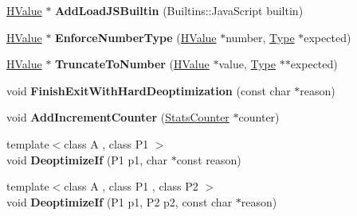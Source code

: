 \begin{DoxyCompactItemize}
\item 
\hypertarget{classv8_1_1internal_1_1_h_graph_builder_a3b52e583c74199a203865d54142ef993}{}\hyperlink{classv8_1_1internal_1_1_h_value}{H\+Value} $\ast$ {\bfseries Add\+Load\+J\+S\+Builtin} (Builtins\+::\+Java\+Script builtin)\label{classv8_1_1internal_1_1_h_graph_builder_a3b52e583c74199a203865d54142ef993}

\item 
\hypertarget{classv8_1_1internal_1_1_h_graph_builder_aa0318ed052ad3dde76828cc864ece24f}{}\hyperlink{classv8_1_1internal_1_1_h_value}{H\+Value} $\ast$ {\bfseries Enforce\+Number\+Type} (\hyperlink{classv8_1_1internal_1_1_h_value}{H\+Value} $\ast$number, \hyperlink{classv8_1_1internal_1_1_type_impl}{Type} $\ast$expected)\label{classv8_1_1internal_1_1_h_graph_builder_aa0318ed052ad3dde76828cc864ece24f}

\item 
\hypertarget{classv8_1_1internal_1_1_h_graph_builder_ad85f954e0270d90f5d078d607b5069ba}{}\hyperlink{classv8_1_1internal_1_1_h_value}{H\+Value} $\ast$ {\bfseries Truncate\+To\+Number} (\hyperlink{classv8_1_1internal_1_1_h_value}{H\+Value} $\ast$value, \hyperlink{classv8_1_1internal_1_1_type_impl}{Type} $\ast$$\ast$expected)\label{classv8_1_1internal_1_1_h_graph_builder_ad85f954e0270d90f5d078d607b5069ba}

\item 
\hypertarget{classv8_1_1internal_1_1_h_graph_builder_a0b1e9d2b9e640ecff306e5ca95e743fa}{}void {\bfseries Finish\+Exit\+With\+Hard\+Deoptimization} (const char $\ast$reason)\label{classv8_1_1internal_1_1_h_graph_builder_a0b1e9d2b9e640ecff306e5ca95e743fa}

\item 
\hypertarget{classv8_1_1internal_1_1_h_graph_builder_acffb06904a8374625c042229fa46d4a4}{}void {\bfseries Add\+Increment\+Counter} (\hyperlink{classv8_1_1internal_1_1_stats_counter}{Stats\+Counter} $\ast$counter)\label{classv8_1_1internal_1_1_h_graph_builder_acffb06904a8374625c042229fa46d4a4}

\item 
\hypertarget{classv8_1_1internal_1_1_h_graph_builder_ae1fe18291f0213f0d4e8bb25a9dd718b}{}{\footnotesize template$<$class A , class P1 $>$ }\\void {\bfseries Deoptimize\+If} (P1 p1, char $\ast$const reason)\label{classv8_1_1internal_1_1_h_graph_builder_ae1fe18291f0213f0d4e8bb25a9dd718b}

\item 
\hypertarget{classv8_1_1internal_1_1_h_graph_builder_ab95c8f0abe165519e0bf0b69758e0730}{}{\footnotesize template$<$class A , class P1 , class P2 $>$ }\\void {\bfseries Deoptimize\+If} (P1 p1, P2 p2, const char $\ast$reason)\label{classv8_1_1internal_1_1_h_graph_builder_ab95c8f0abe165519e0bf0b69758e0730}


\end{DoxyCompactItemize}
